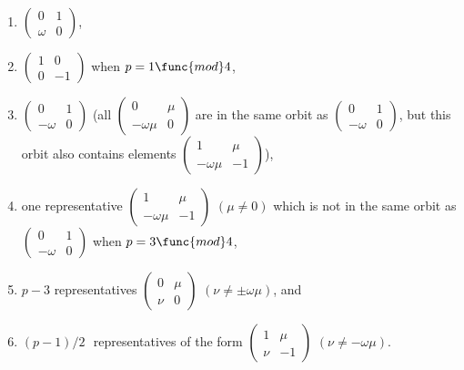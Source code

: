 \documentclass[12pt]{article}
\begin{document}
\begin{enumerate}
\item $\left( 
\begin{array}{ll}
0 & 1 \\ 
\omega  & 0%
\end{array}%
\right) $, 

\item $\left( 
\begin{array}{ll}
1 & 0 \\ 
0 & -1%
\end{array}%
\right) $ when $p=1\func{mod}4$, 

\item $\left( 
\begin{array}{ll}
0 & 1 \\ 
-\omega  & 0%
\end{array}%
\right) $ (all $\left( 
\begin{array}{ll}
0 & \mu  \\ 
-\omega \mu  & 0%
\end{array}%
\right) $ are in the same orbit as $\left( 
\begin{array}{ll}
0 & 1 \\ 
-\omega  & 0%
\end{array}%
\right) $, but this orbit also contains elements $\left( 
\begin{array}{ll}
1 & \mu  \\ 
-\omega \mu  & -1%
\end{array}%
\right) $), 

\item one representative $\left( 
\begin{array}{ll}
1 & \mu  \\ 
-\omega \mu  & -1%
\end{array}%
\right) $ $(\mu \neq 0)$ which is not in the same orbit as $\left( 
\begin{array}{ll}
0 & 1 \\ 
-\omega  & 0%
\end{array}%
\right) $ when $p=3\func{mod}4$, 

\item $p-3$ representatives $\left( 
\begin{array}{ll}
0 & \mu  \\ 
\nu  & 0%
\end{array}%
\right) $ $(\nu \neq \pm \omega \mu )$, and 

\item $(p-1)/2\,$\ representatives of the form $\left( 
\begin{array}{ll}
1 & \mu  \\ 
\nu  & -1%
\end{array}%
\right) $ $(\nu \neq -\omega \mu )$.
\end{enumerate}
\end{document}
